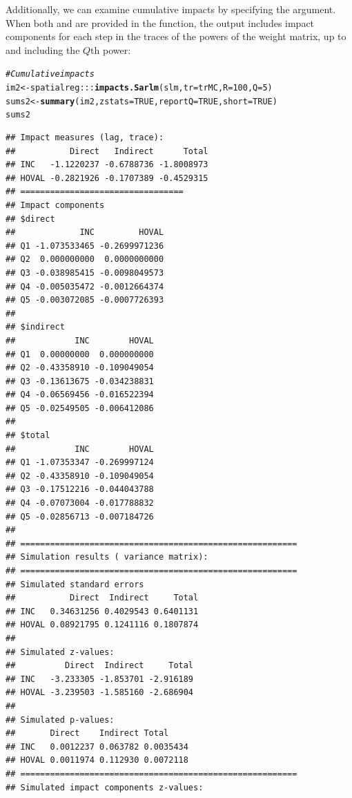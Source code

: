 \documentclass[english,12pt]{book}\usepackage[]{graphicx}\usepackage[]{xcolor}
\makeatletter
\newcommand{\hlnum}[1]{\textcolor[rgb]{0.686,0.059,0.569}{#1}}%
\newcommand{\hlcom}[1]{\textcolor[rgb]{0.678,0.584,0.686}{\textit{#1}}}%
\newcommand{\hlopt}[1]{\textcolor[rgb]{0,0,0}{#1}}%
\newcommand{\hlstd}[1]{\textcolor[rgb]{0.345,0.345,0.345}{#1}}%
\newcommand{\hlkwb}[1]{\textcolor[rgb]{0.69,0.353,0.396}{#1}}%
\newcommand{\hlkwc}[1]{\textcolor[rgb]{0.333,0.667,0.333}{#1}}%
\newcommand{\hlkwd}[1]{\textcolor[rgb]{0.737,0.353,0.396}{\textbf{#1}}}%
\newenvironment{kframe}{%
 \def\at@end@of@kframe{}%
 \ifinner\ifhmode%
  \def\at@end@of@kframe{\end{minipage}}%
  \begin{minipage}{\columnwidth}%
 \fi\fi%
 \def\FrameCommand##1{\hskip\@totalleftmargin \hskip-\fboxsep
 \colorbox{shadecolor}{##1}\hskip-\fboxsep
     \hskip-\linewidth \hskip-\@totalleftmargin \hskip\columnwidth}%
 \MakeFramed {\advance\hsize-\width
   \@totalleftmargin\z@ \linewidth\hsize
   \@setminipage}}%
 {\par\unskip\endMakeFramed%
 \at@end@of@kframe}
\newenvironment{knitrout}{}{} %
\makeatother
\begin{document}
Additionally, we can examine cumulative impacts by specifying the  argument. When both  and  are provided in the  function, the output includes impact components for each step in the traces of the powers of the weight matrix, up to and including the $Q$th power:
\begin{knitrout}
\color{fgcolor}\begin{kframe}
\begin{alltt}
\hlcom{# Cumulative impacts}
\hlstd{im2}   \hlkwb{<-} \hlstd{spatialreg}\hlopt{:::}\hlkwd{impacts.Sarlm}\hlstd{(slm,} \hlkwc{tr} \hlstd{= trMC,} \hlkwc{R} \hlstd{=} \hlnum{100}\hlstd{,} \hlkwc{Q} \hlstd{=} \hlnum{5}\hlstd{)}
\hlstd{sums2} \hlkwb{<-} \hlkwd{summary}\hlstd{(im2,} \hlkwc{zstats} \hlstd{=} \hlnum{TRUE}\hlstd{,} \hlkwc{reportQ} \hlstd{=} \hlnum{TRUE}\hlstd{,} \hlkwc{short} \hlstd{=}  \hlnum{TRUE}\hlstd{)}
\hlstd{sums2}
\end{alltt}
\begin{verbatim}
## Impact measures (lag, trace):
##           Direct   Indirect      Total
## INC   -1.1220237 -0.6788736 -1.8008973
## HOVAL -0.2821926 -0.1707389 -0.4529315
## =================================
## Impact components
## $direct
##             INC         HOVAL
## Q1 -1.073533465 -0.2699971236
## Q2  0.000000000  0.0000000000
## Q3 -0.038985415 -0.0098049573
## Q4 -0.005035472 -0.0012664374
## Q5 -0.003072085 -0.0007726393
## 
## $indirect
##            INC        HOVAL
## Q1  0.00000000  0.000000000
## Q2 -0.43358910 -0.109049054
## Q3 -0.13613675 -0.034238831
## Q4 -0.06569456 -0.016522394
## Q5 -0.02549505 -0.006412086
## 
## $total
##            INC        HOVAL
## Q1 -1.07353347 -0.269997124
## Q2 -0.43358910 -0.109049054
## Q3 -0.17512216 -0.044043788
## Q4 -0.07073004 -0.017788832
## Q5 -0.02856713 -0.007184726
## 
## ========================================================
## Simulation results ( variance matrix):
## ========================================================
## Simulated standard errors
##           Direct  Indirect     Total
## INC   0.34631256 0.4029543 0.6401131
## HOVAL 0.08921795 0.1241116 0.1807874
## 
## Simulated z-values:
##          Direct  Indirect     Total
## INC   -3.233305 -1.853701 -2.916189
## HOVAL -3.239503 -1.585160 -2.686904
## 
## Simulated p-values:
##       Direct    Indirect Total    
## INC   0.0012237 0.063782 0.0035434
## HOVAL 0.0011974 0.112930 0.0072118
## ========================================================
## Simulated impact components z-values:

\end{verbatim}
\end{kframe}
\end{knitrout}
\end{document}
